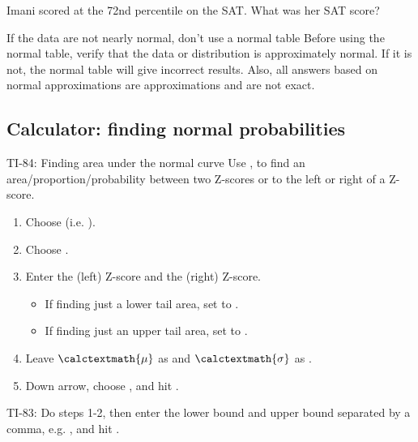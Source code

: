 \begin{exercisewrap}
\begin{nexercise}Imani scored at the 72nd percentile on the SAT. What was her SAT score?\footnotemark\end{nexercise}
\end{exercisewrap}


\begin{onebox}{If the data are not nearly normal, don't use a normal table}
{Before using the normal table, verify that the data or distribution is approximately normal. If it is not, the normal table will give incorrect results. Also, all answers based on normal approximations are approximations and are not exact.}
\end{onebox}



\subsection{Calculator: finding normal probabilities}
\label{normal}

\begin{onebox}{ TI-84: Finding area under the normal curve}
Use  ,  to find an area/proportion/probability between two Z-scores or to the left or right of a Z-score.\vspace{-1mm}
\begin{enumerate}
\setlength{\itemsep}{0mm}
\item Choose   (i.e. ).
\item Choose .
\item Enter the  (left) Z-score and the  (right) Z-score.
\vspace{-1.5mm}
  \begin{itemize}
  \setlength{\itemsep}{0mm}
  \item If finding just a lower tail area, set  to .
  \item If finding just an upper tail area, set  to .
\end{itemize}
\item Leave $\calctextmath{\mu}$ as  and $\calctextmath{\sigma}$ as .
\item Down arrow, choose , and hit .\vspace{-1.5mm}
\end{enumerate}
TI-83: Do steps 1-2, then enter the lower bound and upper bound separated by a comma, e.g. , and hit .\end{onebox}

